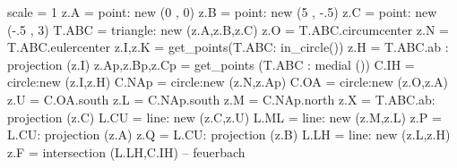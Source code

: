 \begin{minipage}[t]{.5\textwidth}\vspace{0pt}%
\begin{tkzelements}
scale  =  1
z.A    = point: new (0 , 0)
z.B    = point: new (5 , -.5)
z.C    = point: new (-.5 , 3)
T.ABC  = triangle: new (z.A,z.B,z.C)
z.O    = T.ABC.circumcenter
z.N    = T.ABC.eulercenter
z.I,z.K    = get_points(T.ABC: in_circle())
z.H = T.ABC.ab : projection (z.I)
z.Ap,z.Bp,z.Cp = get_points (T.ABC : medial ())
C.IH   = circle:new (z.I,z.H)
C.NAp  = circle:new (z.N,z.Ap)
C.OA   = circle:new (z.O,z.A)
z.U    = C.OA.south
z.L    = C.NAp.south
z.M    = C.NAp.north
z.X    = T.ABC.ab: projection (z.C)
L.CU   = line: new (z.C,z.U)
L.ML   = line: new (z.M,z.L)
z.P    = L.CU: projection (z.A)
z.Q    = L.CU: projection (z.B)
L.LH   = line: new (z.L,z.H)
z.F  = intersection (L.LH,C.IH) -- feuerbach
\end{tkzelements}

\hspace*{\fill}
\end{minipage}

